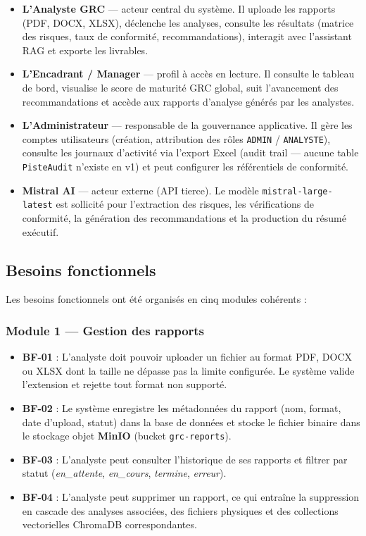 \documentclass[a4paper,12pt,oneside]{report}
\begin{document}
	\begin{itemize}
		\item \textbf{L'Analyste GRC} — acteur central du système. Il uploade
		les rapports (PDF, DOCX, XLSX), déclenche les analyses, consulte les
		résultats (matrice des risques, taux de conformité, recommandations),
		interagit avec l'assistant RAG et exporte les livrables.
		
		\item \textbf{L'Encadrant / Manager} — profil à accès en lecture. Il
		consulte le tableau de bord, visualise le score de maturité GRC global,
		suit l'avancement des recommandations et accède aux rapports d'analyse
		générés par les analystes.
		
		\item \textbf{L'Administrateur} — responsable de la gouvernance applicative.
		Il gère les comptes utilisateurs (création, attribution des rôles
		\texttt{ADMIN} / \texttt{ANALYSTE}), consulte les journaux d'activité via l'export Excel (audit trail --- aucune table \texttt{PisteAudit} n'existe en v1) et
		peut configurer les référentiels de conformité.
		
		\item \textbf{Mistral AI} — acteur externe (API tierce). Le modèle
		\texttt{mistral-large-latest} est sollicité pour l'extraction des
		risques, les vérifications de conformité, la génération des
		recommandations et la production du résumé exécutif.
	\end{itemize}
	
	\subsection{Besoins fonctionnels}
	
	Les besoins fonctionnels ont été organisés en cinq modules cohérents :
	
	\subsubsection*{Module 1 — Gestion des rapports}
	
	\begin{itemize}
		\item \textbf{BF-01} : L'analyste doit pouvoir uploader un fichier au
		format PDF, DOCX ou XLSX dont la taille ne dépasse pas la limite
		configurée. Le système valide l'extension et rejette tout format non
		supporté.
		\item \textbf{BF-02} : Le système enregistre les métadonnées du rapport
		(nom, format, date d'upload, statut) dans la base de données et stocke
		le fichier binaire dans le stockage objet \textbf{MinIO} (bucket \texttt{grc-reports}).
		\item \textbf{BF-03} : L'analyste peut consulter l'historique de ses
		rapports et filtrer par statut (\textit{en\_attente}, \textit{en\_cours},
		\textit{termine}, \textit{erreur}).
		\item \textbf{BF-04} : L'analyste peut supprimer un rapport, ce qui
		entraîne la suppression en cascade des analyses associées, des fichiers
		physiques et des collections vectorielles ChromaDB correspondantes.
	\end{itemize}
	
\end{document}
